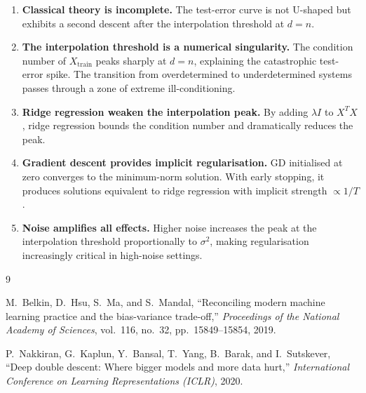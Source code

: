 \documentclass[12pt, a4paper]{article}
\begin{document}
\begin{enumerate}
  \item \textbf{Classical theory is incomplete.} The test-error curve is not U-shaped but exhibits a second descent after the interpolation threshold at $d = n$.

  \item \textbf{The interpolation threshold is a numerical singularity.} The condition number of $X_{\mathrm{train}}$ peaks sharply at $d = n$, explaining the catastrophic test-error spike. The transition from overdetermined to underdetermined systems passes through a zone of extreme ill-conditioning.

  \item \textbf{Ridge regression weaken the interpolation peak.} By adding $\lambda I$ to $X^TX$, ridge regression bounds the condition number and dramatically reduces the peak.

  \item \textbf{Gradient descent provides implicit regularisation.} GD initialised at zero converges to the minimum-norm solution. With early stopping, it produces solutions equivalent to ridge regression with implicit strength $\propto 1/T$.

  \item \textbf{Noise amplifies all effects.} Higher noise increases the peak at the interpolation threshold proportionally to $\sigma^2$, making regularisation increasingly critical in high-noise settings.
\end{enumerate}

\begin{thebibliography}{9}

M.~Belkin, D.~Hsu, S.~Ma, and S.~Mandal,
``Reconciling modern machine learning practice and the bias-variance trade-off,''
\textit{Proceedings of the National Academy of Sciences},
vol.~116, no.~32, pp.~15849--15854, 2019.

P.~Nakkiran, G.~Kaplun, Y.~Bansal, T.~Yang, B.~Barak, and I.~Sutskever,
``Deep double descent: Where bigger models and more data hurt,''
\textit{International Conference on Learning Representations (ICLR)}, 2020.
\end{thebibliography}
\end{document}

